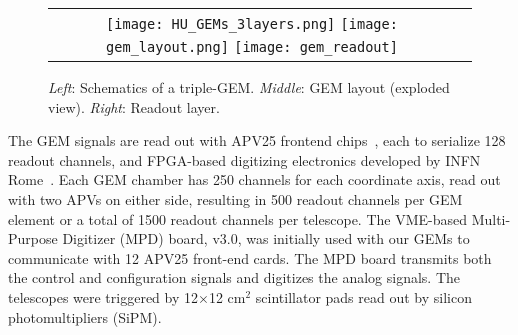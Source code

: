 \documentclass{PoS}
\begin{document}

\begin{figure}[b] %
\centering
\begin{tabular}{cc}
\mbox{\texttt{[image: HU\_GEMs\_3layers.png]}}
\mbox{\texttt{[image: gem\_layout.png]}}
\mbox{\texttt{[image: gem\_readout]}}
\end{tabular}
\caption{\emph{Left}: Schematics of a triple-GEM.
  \emph{Middle}: GEM layout (exploded view).
  \emph{Right}: Readout layer.} 
\label{HUGEMs2} 
\end{figure}


The GEM signals are read out with APV25 frontend chips~\cite{APV25},
each to serialize 128 readout channels, and FPGA-based digitizing
electronics developed by INFN Rome~\cite{infn_SBS}. 
Each GEM chamber has 250 channels for each coordinate axis, %
read out
with two APVs on either side, resulting in 500 readout channels per GEM element
or a total of 1500 readout channels per telescope. The VME-based
Multi-Purpose Digitizer (MPD) board, v3.0, was initially used with our
GEMs to communicate with 12 APV25 front-end cards. The MPD board transmits both
the control and configuration signals and digitizes the analog signals. 
The telescopes were triggered by 12$\times$12 cm$^2$
scintillator pads read out by silicon photomultipliers (SiPM).
\end{document}
